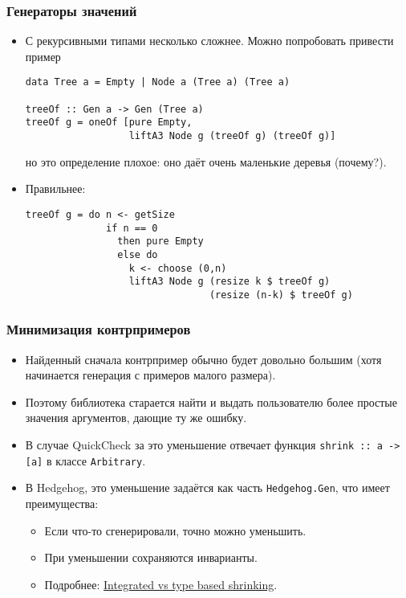 \documentclass[11pt]{beamer}
\begin{document}
\begin{frame}[fragile]
\frametitle{Генераторы значений}
\begin{itemize}
    \item С рекурсивными типами несколько сложнее. Можно попробовать привести пример
\begin{lstlisting}[basicstyle=\ttfamily\scriptsize]
data Tree a = Empty | Node a (Tree a) (Tree a)

treeOf :: Gen a -> Gen (Tree a)
treeOf g = oneOf [pure Empty, 
                  liftA3 Node g (treeOf g) (treeOf g)]
\end{lstlisting}
    но это определение плохое: оно даёт очень маленькие деревья (почему?).
    \item Правильнее:
\begin{lstlisting}[basicstyle=\ttfamily\scriptsize]
treeOf g = do n <- getSize
              if n == 0
                then pure Empty
                else do
                  k <- choose (0,n)
                  liftA3 Node g (resize k $ treeOf g)
                                (resize (n-k) $ treeOf g)
\end{lstlisting}
\end{itemize}
\end{frame}

\begin{frame}[fragile]
\frametitle{Минимизация контрпримеров}
\begin{itemize}
    \item Найденный сначала контрпример обычно будет довольно большим (хотя начинается генерация с примеров малого размера).
    \item Поэтому библиотека старается найти и выдать пользователю более простые значения аргументов, дающие ту же ошибку.
    \item В случае QuickCheck за это уменьшение отвечает функция \lstinline|shrink :: a -> [a]| в классе \lstinline|Arbitrary|. 
    \item В Hedgehog, это уменьшение задаётся как часть \lstinline|Hedgehog.Gen|, что имеет преимущества:
        \begin{itemize}
            \item Если что-то сгенерировали, точно можно уменьшить.
            \item При уменьшении сохраняются инварианты.
            \item Подробнее: \href{https://hypothesis.works/articles/integrated-shrinking/}{Integrated vs type based shrinking}.
        \end{itemize}
\end{itemize}
\end{frame}
\end{document}
